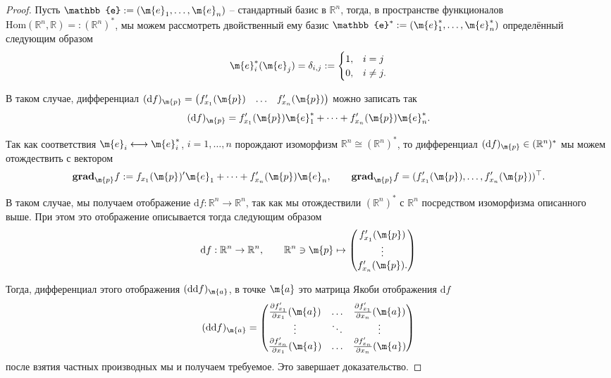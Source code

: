 \begin{proof}
    Пусть $\mathbb{e}: = (\m{e}_1,\ldots, \m{e}_n)$ -- стандартный базис в $\mathbb{R}^n$, тогда, в пространстве функционалов $\mathrm{Hom}(\mathbb{R}^n, \mathbb{R})= : (\mathbb{R}^n)^*$, мы можем рассмотреть двойственный ему базис $\mathbb{e}^*: = (\m{e}_1^*,\ldots, \m{e}_n^*)$ определённый следующим образом
    \[
     \m{e}_i^*(\m{e}_j) = \delta_{i,j}: = \begin{cases}
         1, & i=j \\
         0, & i \ne j.
     \end{cases}
    \]

В таком случае, дифференциал $(\mathrm{d}f)_\m{p} = \begin{pmatrix}
    f_{x_1}'(\m{p}) & \ldots & f_{x_n}'(\m{p})
\end{pmatrix}$ можно записать так
\[
 (\mathrm{d}f)_\m{p} = f_{x_1}'(\m{p})\m{e}_1^* + \cdots + f_{x_n}'(\m{p})\m{e}_n^*.
\]

Так как соответствия $\m{e}_i \longleftrightarrow \m{e}_i^*$, $i=1,\ldots, n$ порождают изоморфизм $\mathbb{R}^n \cong (\mathbb{R}^n)^*$, то дифференциал $(\mathrm{d}f)_\m{p} \in (\mathbb{R}^n)^*$ мы можем отождествить с вектором 
$$\mathbf{grad}_\m{p}f : =f_{x_1}(\m{p})'\m{e}_1 + \cdots + f_{x_n}'(\m{p})\m{e}_n,\qquad \mathbf{grad}_\m{p}f = (f_{x_1}'(\m{p}),\ldots, f_{x_n}'(\m{p}))^\top.$$


В таком случае, мы получаем отображение $\mathrm{d}f: \mathbb{R}^n \to \mathbb{R}^n$, так как мы отождествили $(\mathbb{R}^n)^*$ с $\mathbb{R}^n$ посредством изоморфизма описанного выше. При этом это отображение описывается тогда следующим образом
\[
 \mathrm{d}f: \mathbb{R}^n \to \mathbb{R}^n, \qquad \mathbb{R}^n \ni \m{p} \mapsto \begin{pmatrix}
     f_{x_1}'(\m{p}) \\ \vdots \\ f_{x_n}'(\m{p}).
 \end{pmatrix}
\]

Тогда, дифференциал этого отображения $(\mathrm{d} \mathrm{d}f)_\m{a}$, в точке $\m{a}$ это матрица Якоби отображения $\mathrm{d}f$
\[
 (\mathrm{d} \mathrm{d}f)_\m{a} = \begin{pmatrix}
     \frac{\partial  f_{x_1}'}{\partial x_1}({\m{a}}) & \ldots & \frac{\partial  f_{x_1}'}{\partial x_n} ({\m{a}}) \\
     \vdots & \ddots & \vdots \\
     \frac{\partial  f_{x_n}'}{\partial x_1} ({\m{a}}) & \ldots & \frac{\partial  f_{x_n}'}{\partial x_n} ({\m{a}})
     \end{pmatrix}
\]
после взятия частных производных мы и получаем требуемое. Это завершает доказательство.


    
\end{proof}


